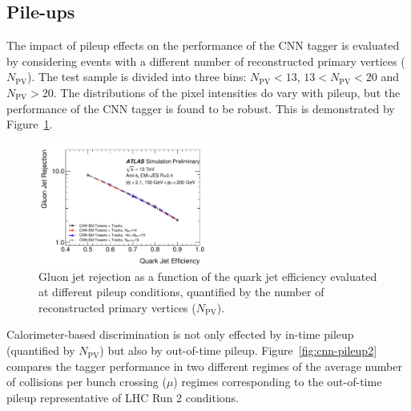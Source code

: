 \subsection{Pile-ups}

The impact of pileup effects on the performance of the CNN tagger is evaluated 
by considering events with a different number of reconstructed primary vertices ($N_\text{PV}$).
The test sample is divided into three bins: $N_\text{PV}<13$, $13<N_\text{PV}<20$ and $N_\text{PV}>20$.  
The distributions of the pixel intensities do vary with pileup, 
but the performance of the CNN tagger is found to be robust. 
This is demonstrated by Figure~\ref{fig:cnn-pileup}. 

\begin{figure}[htpb]
\begin{center}
\includegraphics[width=0.5\textwidth]{figures/CNN/ROC_pt150_200_NPV.pdf}
\caption{Gluon jet rejection as a function of the quark jet efficiency %
evaluated at different pileup conditions, 
quantified by the number of reconstructed primary vertices ($N_\text{PV}$).}
\label{fig:cnn-pileup}
\end{center}
\end{figure}

Calorimeter-based discrimination is not only effected by in-time pileup (quantified by $N_\text{PV}$) but also by out-of-time pileup. 
Figure~\ref{fig:cnn-pileup2} compares the tagger performance in two different regimes of the average number of collisions per bunch crossing ($\mu$) regimes corresponding to the out-of-time pileup representative of LHC Run 2 conditions.

